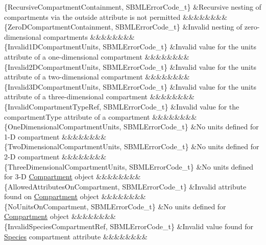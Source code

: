 \begin{DoxyParagraph}{}
\begin{longtabu}
\{Recursive\+Compartment\+Containment, S\+B\+M\+L\+Error\+Code\+\_\+t\} &Recursive nesting of compartments via the \textquotesingle{}outside\textquotesingle{} attribute is not permitted &&&&&&&&\\
\{Zero\+D\+Compartment\+Containment, S\+B\+M\+L\+Error\+Code\+\_\+t\} &Invalid nesting of zero-\/dimensional compartments &&&&&&&&\\
\{Invalid1\+D\+Compartment\+Units, S\+B\+M\+L\+Error\+Code\+\_\+t\} &Invalid value for the \textquotesingle{}units\textquotesingle{} attribute of a one-\/dimensional compartment &&&&&&&&\\
\{Invalid2\+D\+Compartment\+Units, S\+B\+M\+L\+Error\+Code\+\_\+t\} &Invalid value for the \textquotesingle{}units\textquotesingle{} attribute of a two-\/dimensional compartment &&&&&&&&\\
\{Invalid3\+D\+Compartment\+Units, S\+B\+M\+L\+Error\+Code\+\_\+t\} &Invalid value for the \textquotesingle{}units\textquotesingle{} attribute of a three-\/dimensional compartment &&&&&&&&\\
\{Invalid\+Compartment\+Type\+Ref, S\+B\+M\+L\+Error\+Code\+\_\+t\} &Invalid value for the \textquotesingle{}compartment\+Type\textquotesingle{} attribute of a compartment &&&&&&&&\\
\{One\+Dimensional\+Compartment\+Units, S\+B\+M\+L\+Error\+Code\+\_\+t\} &No units defined for 1-\/D compartment &&&&&&&&\\
\{Two\+Dimensional\+Compartment\+Units, S\+B\+M\+L\+Error\+Code\+\_\+t\} &No units defined for 2-\/D compartment &&&&&&&&\\
\{Three\+Dimensional\+Compartment\+Units, S\+B\+M\+L\+Error\+Code\+\_\+t\} &No units defined for 3-\/D \hyperlink{class_compartment}{Compartment} object &&&&&&&&\\
\{Allowed\+Attributes\+On\+Compartment, S\+B\+M\+L\+Error\+Code\+\_\+t\} &Invalid attribute found on \hyperlink{class_compartment}{Compartment} object &&&&&&&&\\
\{No\+Units\+On\+Compartment, S\+B\+M\+L\+Error\+Code\+\_\+t\} &No units defined for \hyperlink{class_compartment}{Compartment} object &&&&&&&&\\
\{Invalid\+Species\+Compartment\+Ref, S\+B\+M\+L\+Error\+Code\+\_\+t\} &Invalid value found for \hyperlink{class_species}{Species} \textquotesingle{}compartment\textquotesingle{} attribute &&&&&&&&\\

\end{longtabu}
\end{DoxyParagraph}
